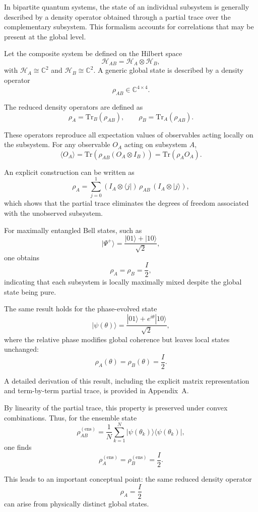\documentclass[a4paper]{article}
\begin{document}
In bipartite quantum systems, the state of an individual subsystem is generally described by a density operator obtained through a partial trace over the complementary subsystem. This formalism accounts for correlations that may be present at the global level.

Let the composite system be defined on the Hilbert space
\[
\mathcal{H}_{AB} = \mathcal{H}_A \otimes \mathcal{H}_B,
\]
with $\mathcal{H}_A \cong \mathbb{C}^2$ and $\mathcal{H}_B \cong \mathbb{C}^2$. A generic global state is described by a density operator
\[
\rho_{AB} \in \mathbb{C}^{4 \times 4}.
\]

The reduced density operators are defined as
\[
\rho_A = \mathrm{Tr}_B(\rho_{AB}), \qquad
\rho_B = \mathrm{Tr}_A(\rho_{AB}).
\]

These operators reproduce all expectation values of observables acting locally on the subsystem. For any observable $O_A$ acting on subsystem $A$,
\[
\langle O_A \rangle = \mathrm{Tr}(\rho_{AB}(O_A \otimes I_B)) = \mathrm{Tr}(\rho_A O_A).
\]

An explicit construction can be written as
\[
\rho_A = \sum_{j=0}^{1} (I_A \otimes \langle j|)\,\rho_{AB}\,(I_A \otimes |j\rangle),
\]
which shows that the partial trace eliminates the degrees of freedom associated with the unobserved subsystem.

For maximally entangled Bell states, such as
\[
|\Psi^+\rangle = \frac{|01\rangle + |10\rangle}{\sqrt{2}},
\]
one obtains
\[
\rho_A = \rho_B = \frac{I}{2},
\]
indicating that each subsystem is locally maximally mixed despite the global state being pure.

The same result holds for the phase-evolved state
\[
|\psi(\theta)\rangle = \frac{|01\rangle + e^{i\theta}|10\rangle}{\sqrt{2}},
\]
where the relative phase modifies global coherence but leaves local states unchanged:
\[
\rho_A(\theta) = \rho_B(\theta) = \frac{I}{2}.
\]

A detailed derivation of this result, including the explicit matrix representation and term-by-term partial trace, is provided in Appendix~A.

By linearity of the partial trace, this property is preserved under convex combinations. Thus, for the ensemble state
\[
\rho_{AB}^{(\mathrm{ens})}
=
\frac{1}{N}
\sum_{k=1}^{N}
|\psi(\theta_k)\rangle\langle\psi(\theta_k)|,
\]
one finds
\[
\rho_A^{(\mathrm{ens})} = \rho_B^{(\mathrm{ens})} = \frac{I}{2}.
\]

This leads to an important conceptual point: the same reduced density operator
\[
\rho_A = \frac{I}{2}
\]
can arise from physically distinct global states.
\end{document}
